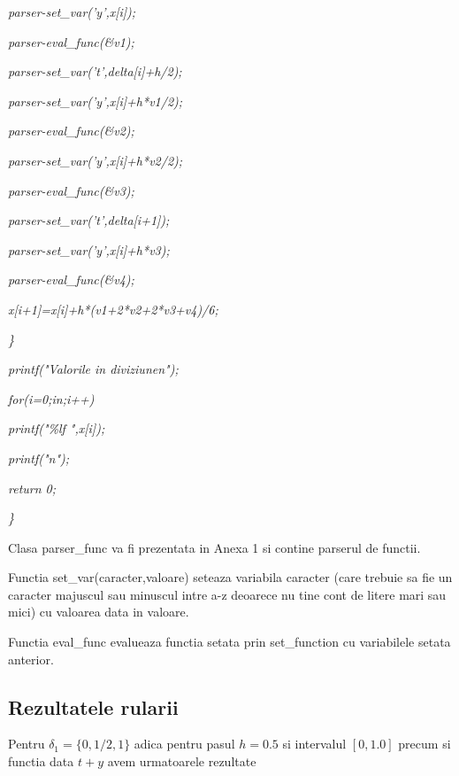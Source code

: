 \documentclass[a4paper,twoside]{book}
\begin{document}
\textit{\qquad \qquad parser-\TEXTsymbol{>}set\_var('y',x[i]);}

\textit{\qquad \qquad parser-\TEXTsymbol{>}eval\_func(\&v1);}

\textit{\qquad \qquad parser-\TEXTsymbol{>}set\_var('t',delta[i]+h/2);}

\textit{\qquad \qquad parser-\TEXTsymbol{>}set\_var('y',x[i]+h*v1/2);}

\textit{\qquad \qquad parser-\TEXTsymbol{>}eval\_func(\&v2);}

\textit{\qquad \qquad parser-\TEXTsymbol{>}set\_var('y',x[i]+h*v2/2);}

\textit{\qquad \qquad parser-\TEXTsymbol{>}eval\_func(\&v3);}

\textit{\qquad \qquad parser-\TEXTsymbol{>}set\_var('t',delta[i+1]);}

\textit{\qquad \qquad parser-\TEXTsymbol{>}set\_var('y',x[i]+h*v3);}

\textit{\qquad \qquad parser-\TEXTsymbol{>}eval\_func(\&v4);}

\textit{\qquad \qquad x[i+1]=x[i]+h*(v1+2*v2+2*v3+v4)/6;}

\textit{\qquad \}}

\textit{\qquad printf("Valorile in diviziune\TEXTsymbol{\backslash}n");}

\textit{\qquad for(i=0;i\TEXTsymbol{<}n;i++)}

\textit{\qquad \qquad printf("\%lf ",x[i]);}

\textit{\qquad printf("\TEXTsymbol{\backslash}n");}

\textit{\qquad return 0;}

\textit{\}}

Clasa parser\_func va fi prezentata in Anexa 1 si contine parserul de
functii.

Functia set\_var(caracter,valoare) seteaza variabila caracter (care trebuie
sa fie un caracter majuscul sau minuscul intre a-z deoarece nu tine cont de
litere mari sau mici) cu valoarea data in valoare.

Functia eval\_func evalueaza functia setata prin set\_function cu
variabilele setata anterior.

\subsection{Rezultatele rularii}

Pentru $\delta _{1}=\{0,1/2,1\}$ adica pentru pasul $h=0.5$ si intervalul $%
[0,1.0]$ precum si functia data $t+y$ avem urmatoarele rezultate
\end{document}
